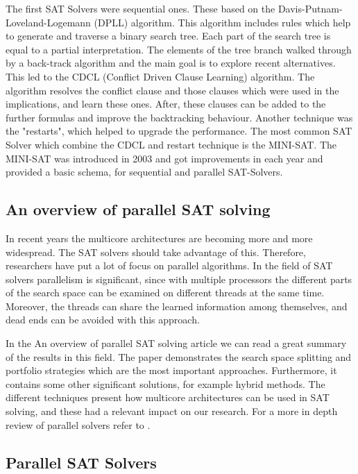 \documentclass{article}
\begin{document}
The first SAT Solvers were sequential ones. These based on the Davis-Putnam-Loveland-Logemann (DPLL) algorithm. This algorithm includes rules which help to generate and traverse a binary search tree. Each part of the search tree is equal to a partial interpretation. The elements of the tree branch walked through by a back-track algorithm and the main goal is to explore recent alternatives. This led to the CDCL (Conflict Driven Clause Learning) algorithm. The algorithm resolves the conflict clause and those clauses which were used in the implications, and learn these ones. After, these clauses can be added to the further formulas and improve the backtracking behaviour. Another technique was the "restarts", which helped to upgrade the performance. The most common SAT Solver which combine the CDCL and restart technique is the MINI-SAT. The MINI-SAT was introduced in 2003 and got improvements in each year and provided a basic schema, for sequential and parallel SAT-Solvers.\cite{OverviewSAT}


\subsection{An overview of parallel SAT solving}

In recent years the multicore architectures are becoming more and more wide\-spread. The SAT solvers should take advantage of this. Therefore, researchers have put a lot of focus on parallel algorithms.
In the field of SAT solvers parallelism is significant, since with multiple processors the different parts of the search space can be examined on different threads at the same time. Moreover, the threads can share the learned information among themselves, and dead ends can be avoided with this approach.


In the An overview of parallel SAT solving article we can read a great summary of the results in this field. The paper demonstrates the search space splitting and portfolio strategies which are the most important approaches. Furthermore, it contains some other significant solutions, for example hybrid methods. The different techniques present how multicore architectures can be used in SAT solving, and these had a relevant impact on our research. For a more in depth review of parallel solvers refer to \cite{paralellSAT}.


\subsection{Parallel SAT Solvers}
\end{document}
